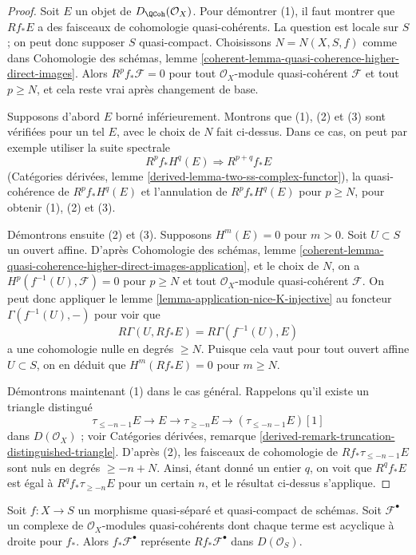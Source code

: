 \begin{proof}
Soit $E$ un objet de $D_\QCoh(\mathcal{O}_X)$. Pour démontrer (1), il faut
montrer que $Rf_*E$ a des faisceaux de cohomologie quasi-cohérents. La question est locale
sur $S$ ; on peut donc supposer $S$ quasi-compact. Choisissons $N = N(X, S, f)$ comme dans
Cohomologie des schémas, lemme
\ref{coherent-lemma-quasi-coherence-higher-direct-images}.
Alors $R^pf_*\mathcal{F} = 0$ pour tout $\mathcal{O}_X$-module quasi-cohérent
$\mathcal{F}$ et tout $p \geq N$, et cela reste vrai après changement de base.

\medskip\noindent
Supposons d'abord $E$ borné inférieurement. Montrons que (1), (2) et (3) sont vérifiées
pour un tel $E$, avec le choix de $N$ fait ci-dessus. Dans ce cas, on peut par exemple utiliser la
suite spectrale
$$
R^pf_*H^q(E) \Rightarrow R^{p + q}f_*E
$$
(Catégories dérivées, lemme \ref{derived-lemma-two-ss-complex-functor}),
la quasi-cohérence de $R^pf_*H^q(E)$ et l'annulation de $R^pf_*H^q(E)$
pour $p \geq N$, pour obtenir (1), (2) et (3).

\medskip\noindent
Démontrons ensuite (2) et (3). Supposons $H^m(E) = 0$ pour $m > 0$.
Soit $U \subset S$ un ouvert affine. D'après Cohomologie des schémas, lemme
\ref{coherent-lemma-quasi-coherence-higher-direct-images-application},
et le choix de $N$,
on a $H^p(f^{-1}(U), \mathcal{F}) = 0$ pour $p \geq N$
et tout $\mathcal{O}_X$-module quasi-cohérent $\mathcal{F}$.
On peut donc appliquer le lemme \ref{lemma-application-nice-K-injective}
au foncteur $\Gamma(f^{-1}(U), -)$ pour voir que
$$
R\Gamma(U, Rf_*E) = R\Gamma(f^{-1}(U), E)
$$
a une cohomologie nulle en degrés $\geq N$. Puisque cela vaut pour
tout ouvert affine $U \subset S$, on en déduit que $H^m(Rf_*E) = 0$
pour $m \geq N$.

\medskip\noindent
Démontrons maintenant (1) dans le cas général. Rappelons qu'il existe un
triangle distingué
$$
\tau_{\leq -n - 1}E \to E \to \tau_{\geq -n}E \to
(\tau_{\leq -n - 1}E)[1]
$$
dans $D(\mathcal{O}_X)$ ; voir Catégories dérivées, remarque
\ref{derived-remark-truncation-distinguished-triangle}.
D'après (2), les faisceaux de cohomologie de $Rf_*\tau_{\leq -n - 1}E$
sont nuls en degrés $\geq -n + N$.
Ainsi, étant donné un entier $q$, on voit que $R^qf_*E$ est égal
à $R^qf_*\tau_{\geq -n}E$ pour un certain $n$, et le résultat
ci-dessus s'applique.
\end{proof}

\begin{lemma}
\label{lemma-acyclicity-lemma}
Soit $f : X \to S$ un morphisme quasi-séparé et quasi-compact
de schémas. Soit $\mathcal{F}^\bullet$ un complexe de
$\mathcal{O}_X$-modules quasi-cohérents dont chaque terme est acyclique à droite pour $f_*$.
Alors $f_*\mathcal{F}^\bullet$ représente $Rf_*\mathcal{F}^\bullet$
dans $D(\mathcal{O}_S)$.
\end{lemma}

